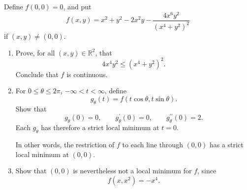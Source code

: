 	\begin{exercise}[Rudin 9.15]
		Define $f(0,0)=0$, and put
		\begin{equation}
			f(x,y)
			=
			x^2+y^2-2x^2y-\frac{4x^6y^2}{(x^4+y^2)^2}
		\end{equation}
		if $(x,y)\neq(0,0)$.

		\begin{enumerate}[label=(\alph*)]
			\item Prove, for all $(x,y)\in\mathbb{R}^2$, that
			\begin{equation}
				4x^4y^2\leq(x^4+y^2)^2.
			\end{equation}
			Conclude that $f$ is continuous.

			\item For $0\leq\theta\leq2\pi$, $-\infty<t<\infty$, define
			\begin{equation}
				g_\theta(t)=f(t\cos\theta,t\sin\theta).
			\end{equation}
			Show that
			\begin{equation}
				g_\theta(0)=0,
				\qquad
				g_\theta^\prime(0)=0,
				\qquad
				g_\theta^{\prime\prime}(0)=2.
			\end{equation}
			Each $g_\theta$ has therefore a strict local minimum at $t=0$.

			In other words, the restriction of $f$ to each line through $(0,0)$ has a strict local minimum at $(0,0)$.

			\item Show that $(0,0)$ is nevertheless not a local minimum for $f$, since
			\begin{equation}
				f(x,x^2)=-x^4.
			\end{equation}
		\end{enumerate}
	\end{exercise}
